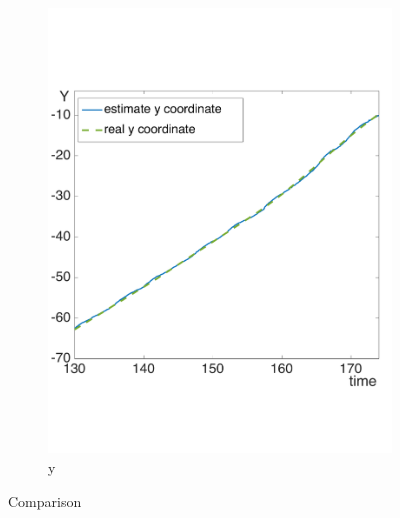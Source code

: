 \begin{figure}[!htbp]
\begin{subfigure}[b]{0.45\textwidth}
        \includegraphics[width=\textwidth]{img/high_altitude_error_y.pdf}
        \caption{y}
        \label{fig:two}
   \end{subfigure}
  \caption{Comparison}
  \label{fig:ekf_high_altitude_comparison}
\end{figure} 

